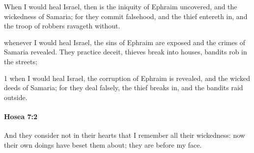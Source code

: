 			\begin{versebox}
					\item[BHS] 
					\item[LXX] 
					\item[ASV] When I would heal Israel, then is the iniquity of Ephraim uncovered, and the wickedness of Samaria; for they commit falsehood, and the thief entereth in, and the troop of robbers ravageth without.
					\item[NIV] whenever I would heal Israel, the sins of Ephraim are exposed and the crimes of Samaria revealed. They practice deceit, thieves break into houses, bandits rob in the streets;
					\item[NRSV] 1 when I would heal Israel, the corruption of Ephraim is revealed, and the wicked deeds of Samaria; for they deal falsely, the thief breaks in, and the bandits raid outside.
			\end{versebox}

		\paragraph{Hosea 7:2} %
			\label{HOSEA-7-2}

			And they consider not in their hearts that I remember all their wickedness: now their own doings have beset them about; they are before my face.

